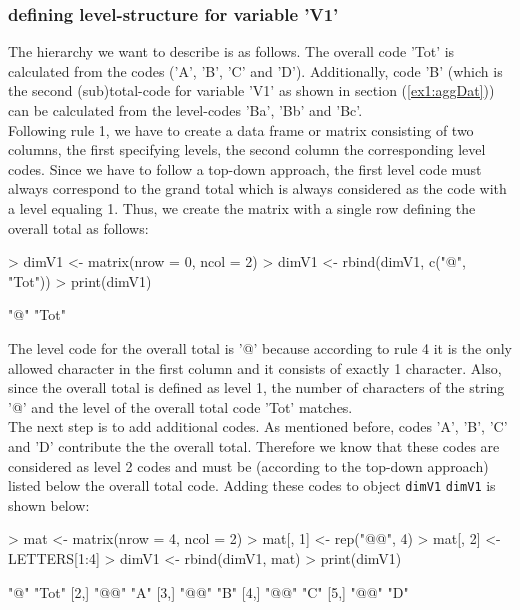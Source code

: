 \documentclass{article}
\begin{document}
\subsubsection*{defining level-structure for variable 'V1'}
The hierarchy we want to describe is as follows. The overall code 'Tot'
is calculated from the codes ('A', 'B', 'C' and 'D'). Additionally, code 'B' (which
is the second (sub)total-code for variable 'V1' as shown in section  (\ref{ex1:aggDat}))
can be calculated from the level-codes 'Ba', 'Bb' and 'Bc'. \\

Following rule 1, we have to create a data frame or matrix  consisting of two 
columns, the first specifying levels, the second column the corresponding level 
codes. Since we have to follow a top-down approach, the first level code must 
always correspond to the grand total which is always considered as the code with 
a level equaling 1. Thus, we create the matrix with a single row defining the 
overall total as follows:
\begin{Schunk}
\begin{Sinput}
> dimV1 <- matrix(nrow = 0, ncol = 2)
> dimV1 <- rbind(dimV1, c("@", "Tot"))
> print(dimV1)
\end{Sinput}
\begin{Soutput}
     [,1] [,2] 
[1,] "@"  "Tot"
\end{Soutput}
\end{Schunk}

The level code for the overall total is '@' because according to rule 4 it is the
only allowed character in the first column and it consists of exactly 1 character.
Also, since the overall total is defined as level 1, the number of characters of
the string '@' and the level of the overall total code 'Tot' matches. \\

The next step is to add additional codes. As mentioned before, codes 'A', 'B', 
'C' and 'D' contribute the the overall total. Therefore we know that these codes
are considered as level 2 codes and must be (according to the top-down approach)
listed below the overall total code. Adding these codes to object {\tt dimV1} 
{\tt dimV1} is shown below:
\begin{Schunk}
\begin{Sinput}
> mat <- matrix(nrow = 4, ncol = 2)
> mat[, 1] <- rep("@@", 4)
> mat[, 2] <- LETTERS[1:4]
> dimV1 <- rbind(dimV1, mat)
> print(dimV1)
\end{Sinput}
\begin{Soutput}
     [,1] [,2] 
[1,] "@"  "Tot"
[2,] "@@" "A"  
[3,] "@@" "B"  
[4,] "@@" "C"  
[5,] "@@" "D"  
\end{Soutput}
\end{Schunk}
\end{document}
